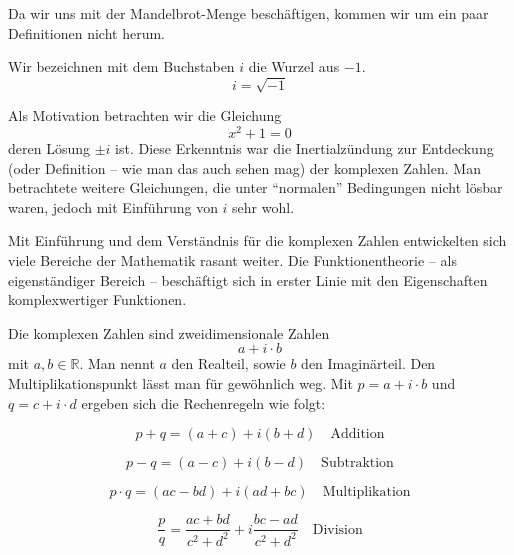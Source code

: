 Da wir uns mit der Mandelbrot-Menge beschäftigen, kommen wir um ein paar Definitionen nicht herum. 

\begin{definition}
Wir bezeichnen mit dem Buchstaben $i$ die Wurzel aus $-1$. 
\begin{equation}
i = \sqrt{-1}
\end{equation}
\end{definition}
Als Motivation betrachten wir die Gleichung
\begin{equation}
x^2 +1=0
\end{equation}
deren Lösung $\pm i$ ist. Diese Erkenntnis war die Inertialzündung zur Entdeckung (oder Definition -- wie man das auch sehen mag) der komplexen Zahlen. Man betrachtete weitere Gleichungen, die unter "`normalen"' Bedingungen nicht lösbar waren, jedoch mit Einführung von $i$ sehr wohl. 

Mit Einführung und dem Verständnis für die komplexen Zahlen entwickelten sich viele Bereiche der Mathematik rasant weiter. Die Funktionentheorie -- als eigenständiger Bereich -- beschäftigt sich in erster Linie mit den Eigenschaften komplexwertiger Funktionen.  

\begin{definition}
Die komplexen Zahlen sind zweidimensionale Zahlen
\begin{equation}\label{eq:komplex}
a+i\cdot b
\end{equation}
mit $a,b\in \mathbb{R}$. Man nennt $a$ den Realteil, sowie $b$ den Imaginärteil. Den Multiplikationspunkt lässt man für gewöhnlich weg.  Mit $p=a+i\cdot b$ und $q=c+i\cdot d$ ergeben sich die Rechenregeln wie folgt:
\end{definition}

\begin{equation}\label{eq:cmlxadd}
p+q = (a+c)+i(b+d)\quad \text{Addition}
\end{equation}

\begin{equation}\label{eq:cmlxsub}
p-q = (a-c)+i(b-d) \quad \text{Subtraktion}
\end{equation}

\begin{equation}\label{eq:cmlxmul}
p\cdot q = (ac-bd)+i(ad+bc) \quad \text{Multiplikation}
\end{equation}

\begin{equation}\label{eq:cmlxdiv}
\frac{p}{q} = \frac{ac+bd}{c^2+d^2} + i\frac{bc-ad}{c^2+d^2}\quad \text{Division}
\end{equation}

